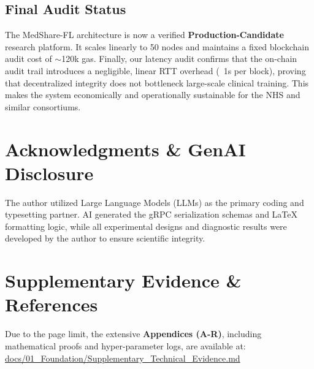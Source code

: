 \documentclass[10pt, a4paper, twocolumn]{article}
\begin{document}
\subsection{Final Audit Status}
The MedShare-FL architecture is now a verified \textbf{Production-Candidate} research platform. It scales linearly to 50 nodes and maintains a fixed blockchain audit cost of $\sim$120k gas. Finally, our latency audit confirms that the on-chain audit trail introduces a negligible, linear RTT overhead (~1s per block), proving that decentralized integrity does not bottleneck large-scale clinical training. This makes the system economically and operationally sustainable for the NHS and similar consortiums.

\section*{Acknowledgments \& GenAI Disclosure}
The author utilized Large Language Models (LLMs) as the primary coding and typesetting partner. AI generated the gRPC serialization schemas and LaTeX formatting logic, while all experimental designs and diagnostic results were developed by the author to ensure scientific integrity.

\section*{Supplementary Evidence \& References}
Due to the page limit, the extensive \textbf{Appendices (A-R)}, including mathematical proofs and hyper-parameter logs, are available at: \\
 \url{docs/01_Foundation/Supplementary_Technical_Evidence.md}
\end{document}
